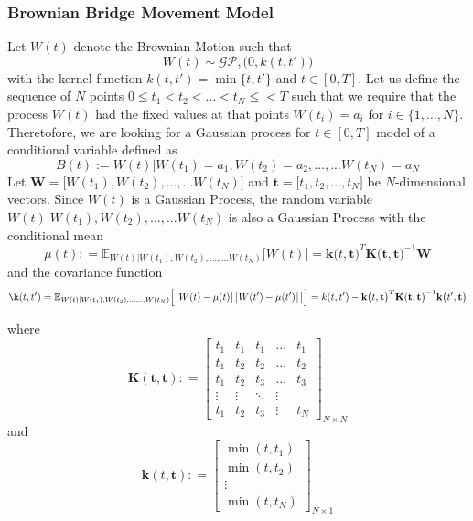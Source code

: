 \subsubsection{Brownian Bridge Movement Model}

Let $W(t)$ denote the Brownian Motion such that
\begin{equation}
W(t) \sim \mathcal{GP}, \big(0,k(t,t') \big)
\end{equation}
with the kernel function $k(t,t') =  \min \big\{ t,t'\big\} $ and $t \in [0,T]$. Let us define the sequence of $N$ points $0 \leq t_1 < t_2 < \ldots <t_N \leq < T$ such that we require that the process $W(t)$ had the fixed values at that points $W(t_i) = a_i$ for $ i \in \big\{1,\ldots,N \big\}$.  Theretofore, we are looking for a Gaussian process for $t \in [0,T]$ model of a conditional variable defined as 
\begin{equation}
B(t) := W(t) | W(t_1) = a_1, W(t_2) = a_2, \ldots, ... W(t_N) = a_N
\end{equation} 
Let $\mathbf{W} = \big[W(t_1) , W(t_2) , \ldots, ... W(t_N)  \big]$ and $\mathbf{t} = \big[ t_1, t_2, \ldots, t_N \big]$ be $N$-dimensional vectors.  Since $W(t)$ is a Gaussian Process, the random variable $W(t) | W(t_1) , W(t_2) , \ldots, ... W(t_N) $ is also a Gaussian Process with the conditional mean
\begin{equation}
\mu(t) : = \mathbb{E}_{W(t) | W(t_1) , W(t_2) , \ldots, ... W(t_N) }\big[ W(t) \big] = \mathbf{k} \big( t, \mathbf{t} \big)^T \mathbf{K}(\mathbf{t},\mathbf{t} \big)^{-1} \mathbf{W}
\end{equation}
and the covariance function 
\begin{equation}
\k(t,t') = \mathbb{E}_{W(t) | W(t_1) , W(t_2) , \ldots, ... W(t_N) }\Big[ \big[ W(t) -\mu(t)  \big] \big[W(t')  -\mu(t')  \big] \big] \Big] =k(t,t') -  \mathbf{k} \big( t, \mathbf{t} \big)^T \mathbf{K}(\mathbf{t},\mathbf{t} \big)^{-1}   \mathbf{k} \big( t', \mathbf{t} \big)
\end{equation}

where
\begin{equation}
\mathbf{K}(\mathbf{t},\mathbf{t}): =\begin{bmatrix}
t_1 & t_1 & t_1 & \ldots & t_1 \\
t_1 & t_2 & t_2 & \ldots & t_2 \\
t_1 & t_2 & t_3 & \ldots & t_3 \\
\vdots & \vdots & \ddots & \vdots \\
t_1 & t_2 & t_3 & \vdots & t_N
\end{bmatrix}_{N \times N}
\end{equation}
and 
\begin{equation}
\mathbf{k}(t,\mathbf{t}): =\begin{bmatrix}
\min(t,t_1) \\
\min(t,t_2) \\
\vdots \\
\min(t,t_N)
\end{bmatrix}_{N \times 1}
\end{equation}


